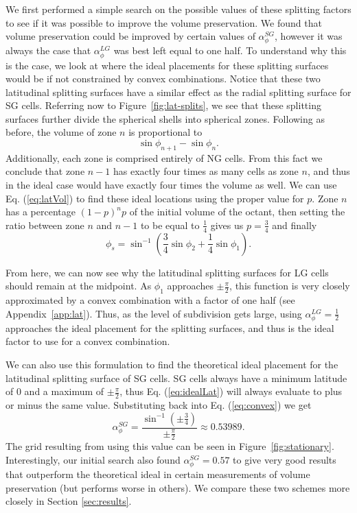 We first performed a simple search on the possible values of these splitting factors to see if it was possible to improve the volume preservation. We found that volume preservation could be improved by certain values of $\alpha_{\phi}^{SG}$, however it was always the case that $\alpha_{\phi}^{LG}$ was best left equal to one half. To understand why this is the case, we look at where the ideal placements for these splitting surfaces would be if not constrained by convex combinations. Notice that these two latitudinal splitting surfaces have a similar effect as the radial splitting surface for SG cells. Referring now to Figure~\ref{fig:lat-splits}, we see that these splitting surfaces further divide the spherical shells into spherical zones. Following as before, the volume of zone $n$ is proportional to 
%
\begin{equation*}
\sin\phi_{n+1} - \sin\phi_{n}.
\end{equation*}
%
Additionally, each zone is comprised entirely of NG cells. From this fact we conclude that zone $n-1$ has exactly four times as many cells as zone $n$, and thus in the ideal case would have exactly four times the volume as well. We can use Eq. (\ref{eq:latVol}) to find these ideal locations using the proper value for $p$. Zone $n$ has a percentage $\left( 1 - p \right)^{n} p$ of the initial volume of the octant, then setting the ratio between zone $n$ and $n-1$ to be equal to $\frac{1}{4}$ gives us $p = \frac{3}{4}$ and finally
%
\begin{equation} \label{eq:idealLat}
\phi_{s} = \sin^{-1} \left( \frac{3}{4} \sin\phi_{2} + \frac{1}{4} \sin\phi_{1} \right).
\end{equation}
%

From here, we can now see why the latitudinal splitting surfaces for LG cells should remain at the midpoint. As $\phi_{1}$ approaches $\pm \frac{\pi}{2}$, this function is very closely approximated by a convex combination with a factor of one half (see Appendix~\ref{app:lat}). Thus, as the level of subdivision gets large, using $\alpha_{\phi}^{LG} = \frac{1}{2}$ approaches the ideal placement for the splitting surfaces, and thus is the ideal factor to use for a convex combination.



We can also use this formulation to find the theoretical ideal placement for the latitudinal splitting surface of SG cells. SG cells always have a minimum latitude of $0$ and a maximum of $\pm \frac{\pi}{2}$, thus Eq. (\ref{eq:idealLat}) will always evaluate to plus or minus the same value. Substituting back into Eq. (\ref{eq:convex}) we get
%
\begin{equation} \label{eq:latValue}
\alpha_{\phi}^{SG} = \frac{ \sin^{-1} \left( \pm \frac{3}{4} \right) }{ \pm \frac{\pi}{2} } \approx 0.53989.
\end{equation}
%
The grid resulting from using this value can be seen in Figure~\ref{fig:stationary}. Interestingly, our initial search also found $\alpha_{\phi}^{SG} = 0.57$ to give very good results that outperform the theoretical ideal in certain measurements of volume preservation (but performs worse in others). We compare these two schemes more closely in Section \ref{sec:results}. 


